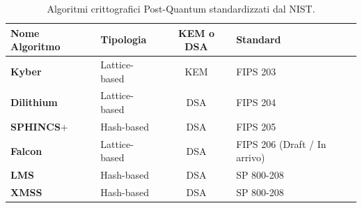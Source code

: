 \begin{table}[h]
    \centering
    \begin{tabular}{llcl}
        \toprule
        \textbf{Nome Algoritmo} & \textbf{Tipologia} & \textbf{KEM o DSA} & \textbf{Standard} \\ 
        \midrule
        \textbf{Kyber} & Lattice-based & KEM & FIPS 203 \\ 
        \textbf{Dilithium} & Lattice-based & DSA & FIPS 204 \\ 
        \textbf{SPHINCS}+ & Hash-based & DSA & FIPS 205 \\ 
        \textbf{Falcon} & Lattice-based & DSA & FIPS 206 (Draft / In arrivo) \\ 
        \textbf{LMS} & Hash-based & DSA & SP 800-208 \\ 
        \textbf{XMSS} & Hash-based & DSA & SP 800-208 \\ 
        \bottomrule
    \end{tabular}
    \caption{Algoritmi crittografici Post-Quantum standardizzati dal NIST.}
    \label{tab:00_nist_pqc}
\end{table}